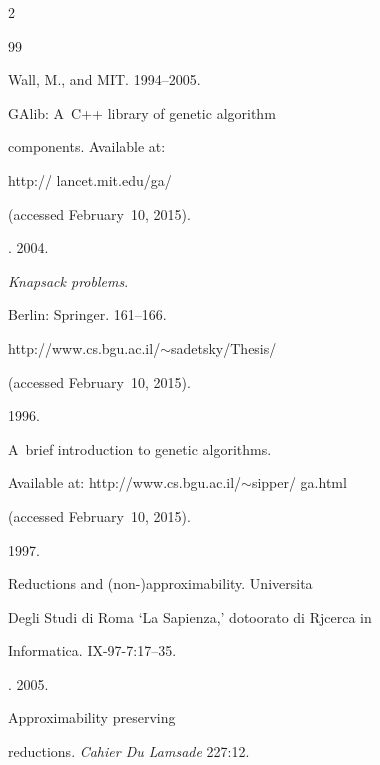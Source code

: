 \begin{multicols}{2}
{{\begin{thebibliography}{99}


Wall, M., and MIT. 1994--2005.


GAlib: A~C++ library of genetic algorithm


components. Available at: {\sf


http:// lancet.mit.edu/ga/} (accessed February~10, 2015).







. 2004.


\textit{Knapsack problems}.


Berlin: Springer. 161--166.







{\sf http://www.cs.bgu.ac.il/$\sim$sadetsky/Thesis/}


(accessed February~10, 2015).







  1996.


A~brief introduction to genetic algorithms.


Available at: {\sf http://www.cs.bgu.ac.il/$\sim$sipper/ ga.html}


(accessed February~10, 2015).







 1997.


Reductions and (non-)approximability. Universita


Degli Studi di Roma `La Sapienza,' dotoorato di Rjcerca in


Informatica. IX-97-7:17--35.
















.  2005.


Approximability preserving


reductions. \textit{Cahier Du Lamsade} 227:12.






\end{thebibliography}}}
\end{multicols}
